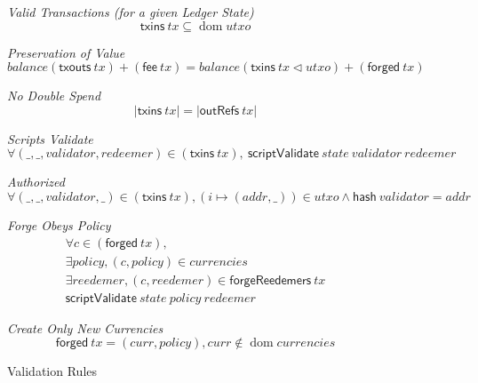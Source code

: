 \documentclass[11pt,a4paper]{article}
\DeclareMathOperator{\dom}{dom}
\newcommand{\restrictdom}{\lhd}
\newcommand{\var}[1]{\mathit{#1}}
\newcommand{\fun}[1]{\mathsf{#1}}
\newcommand{\scriptValidate}[3]{\fun{scriptValidate} ~ \var{#1} ~ \var{#2} ~ \var{#3}}
\newcommand{\txins}[1]{\fun{txins}\ \var{#1}}
\newcommand{\txouts}[1]{\fun{txouts}\ \var{#1}}
\newcommand{\hash}[1]{\fun{hash}\ \var{#1}}
\newcommand{\forged}[1]{\fun{forged}\ \var{#1}}
\newcommand{\forgeReedemers}[1]{\fun{forgeReedemers}\ \var{#1}}
\newcommand{\fee}[1]{\fun{fee}\ \var{#1}}
\newcommand{\created}[1]{\fun{forged}\ \var{#1}}
\newcommand{\outRefs}[1]{\fun{outRefs}\ \var{#1}}
\begin{document}
\begin{figure}
\emph{Valid Transactions (for a given Ledger State)}
%
\begin{equation*}
\txins{tx} \subseteq \dom \var{utxo}
\end{equation*}

\emph{Preservation of Value}
%
\begin{equation*}
balance (\txouts tx) + (\fee tx)
  = balance (\txins tx \restrictdom utxo) + (\forged tx)
\end{equation*}

\emph{No Double Spend}
%
\begin{equation*}
\lvert \txins tx \rvert = \lvert \outRefs tx\rvert
\end{equation*}

\emph{Scripts Validate}
%
\begin{equation*}
\forall (\_, \_, validator, redeemer)\in(\txins tx),
~ \scriptValidate{state}{validator}{redeemer}
\end{equation*}

\emph{Authorized}
%
\begin{equation*}
  \forall (\_, \_, validator, \_)\in(\txins tx),
  (i \mapsto (addr, \_)) \in \var{utxo} \land \hash validator = addr
\end{equation*}

\emph{Forge Obeys Policy}
%
\begin{equation*}
\begin{array}{c}
\forall c\in(\forged tx), \\
\exists policy, (c, policy) \in \var{currencies} \\
\exists reedemer, (c, reedemer) \in \forgeReedemers tx \\
\scriptValidate{state}{policy}{redeemer}
\end{array}
\end{equation*}

\emph{Create Only New Currencies}
%
\begin{equation*}
\created tx = (curr, policy), curr \notin \dom currencies
\end{equation*}

\caption{Validation Rules}
\label{fig:validation_rules}
\end{figure}
\end{document}
